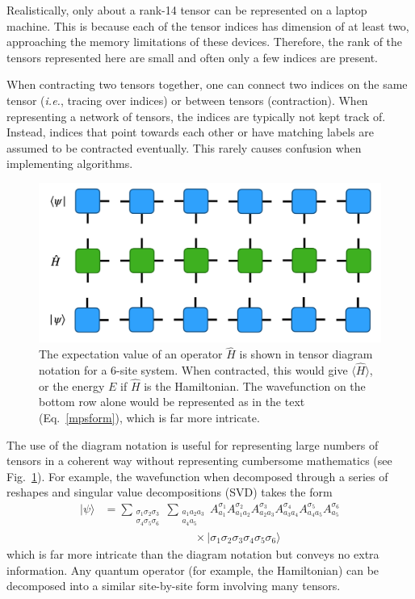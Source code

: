 \documentclass{juliacon}
\begin{document}
Realistically, only about a rank-14 tensor can be represented on a laptop machine. This is because each of the tensor indices has dimension of at least two, approaching the memory limitations of these devices. Therefore, the rank of the tensors represented here are small and often only a few indices are present.

When contracting two tensors together, one can connect two indices on the same tensor ({\it i.e.}, tracing over indices) or between tensors (contraction). When representing a network of tensors, the indices are typically not kept track of. Instead, indices that point towards each other or have matching labels are assumed to be contracted eventually. This rarely causes confusion when implementing algorithms.

\begin{figure}
\includegraphics[width=\columnwidth]{network.png}
\caption{The expectation value of an operator $\hat H$ is shown in tensor diagram notation for a 6-site system. When contracted, this would give $\langle\hat H\rangle$, or the energy $E$ if $\hat H$ is the Hamiltonian. The wavefunction on the bottom row alone would be represented as in the text (Eq.~\ref{mpsform}), which is far more intricate.
\label{network}
}
\end{figure}

The use of the diagram notation is useful for representing large numbers of tensors in a coherent way without representing cumbersome mathematics (see Fig.~\ref{network}). For example, the wavefunction when decomposed through a series of reshapes and singular value decompositions (SVD) takes the form \cite{bakerCJP21}
\begin{align}\nonumber
|\psi\rangle&=\sum_{\substack{\sigma_1\sigma_2\sigma_3\\\sigma_4\sigma_5\sigma_6}}\sum_{\substack{a_1a_2a_3\\a_4a_5}}A^{\sigma_1}_{a_1}A^{\sigma_2}_{a_1a_2}A^{\sigma_3}_{a_2a_3}A^{\sigma_4}_{a_3a_4}A^{\sigma_5}_{a_4a_5}A^{\sigma_6}_{a_5}\\
&\quad\quad\quad\quad\quad\quad\quad\quad\times|\sigma_1\sigma_2\sigma_3\sigma_4\sigma_5\sigma_6\rangle
\label{mpsform}
\end{align}
which is far more intricate than the diagram notation but conveys no extra information. Any quantum operator (for example, the Hamiltonian) can be decomposed into a similar site-by-site form involving many tensors.
\end{document}
